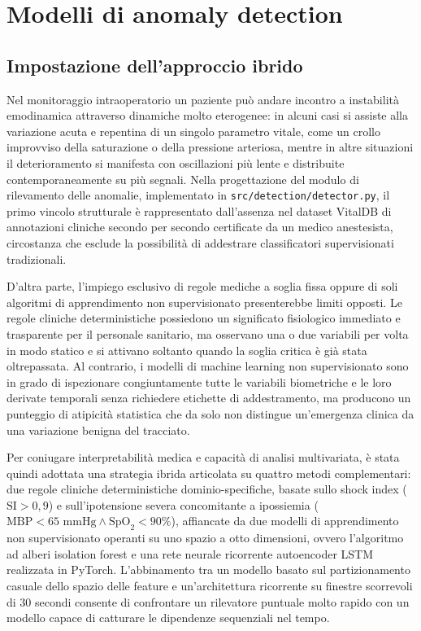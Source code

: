 \chapter{Modelli di anomaly detection}

\section{Impostazione dell'approccio ibrido}
Nel monitoraggio intraoperatorio un paziente pu\`o andare incontro a instabilit\`a emodinamica attraverso dinamiche molto eterogenee: in alcuni casi si assiste alla variazione acuta e repentina di un singolo parametro vitale, come un crollo improvviso della saturazione o della pressione arteriosa, mentre in altre situazioni il deterioramento si manifesta con oscillazioni pi\`u lente e distribuite contemporaneamente su pi\`u segnali. Nella progettazione del modulo di rilevamento delle anomalie, implementato in \texttt{src/detection/detector.py}, il primo vincolo strutturale \`e rappresentato dall'assenza nel dataset VitalDB di annotazioni cliniche secondo per secondo certificate da un medico anestesista, circostanza che esclude la possibilit\`a di addestrare classificatori supervisionati tradizionali.

D'altra parte, l'impiego esclusivo di regole mediche a soglia fissa oppure di soli algoritmi di apprendimento non supervisionato presenterebbe limiti opposti. Le regole cliniche deterministiche possiedono un significato fisiologico immediato e trasparente per il personale sanitario, ma osservano una o due variabili per volta in modo statico e si attivano soltanto quando la soglia critica \`e gi\`a stata oltrepassata. Al contrario, i modelli di machine learning non supervisionato sono in grado di ispezionare congiuntamente tutte le variabili biometriche e le loro derivate temporali senza richiedere etichette di addestramento, ma producono un punteggio di atipicit\`a statistica che da solo non distingue un'emergenza clinica da una variazione benigna del tracciato.

Per coniugare interpretabilit\`a medica e capacit\`a di analisi multivariata, \`e stata quindi adottata una strategia ibrida articolata su quattro metodi complementari: due regole cliniche deterministiche dominio-specifiche, basate sullo shock index ($\text{SI} > 0,9$) e sull'ipotensione severa concomitante a ipossiemia ($\text{MBP} < 65\text{ mmHg} \land \text{SpO}_2 < 90\%$), affiancate da due modelli di apprendimento non supervisionato operanti su uno spazio a otto dimensioni, ovvero l'algoritmo ad alberi isolation forest e una rete neurale ricorrente autoencoder LSTM realizzata in PyTorch. L'abbinamento tra un modello basato sul partizionamento casuale dello spazio delle feature e un'architettura ricorrente su finestre scorrevoli di $30$ secondi consente di confrontare un rilevatore puntuale molto rapido con un modello capace di catturare le dipendenze sequenziali nel tempo.

